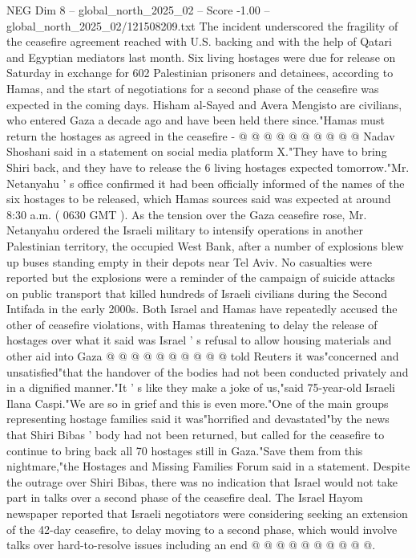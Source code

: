 \begin{textsample}{NEG Dim 8 – global\_north\_2025\_02 – Score -1.00 – global\_north\_2025\_02/121508209.txt}
The incident underscored the fragility of the ceasefire agreement reached with U.S. backing and with the help of Qatari and Egyptian mediators last month.
Six living hostages were due for release on Saturday in exchange for 602 Palestinian prisoners and detainees, according to Hamas, and the start of negotiations for a second phase of the ceasefire was expected in the coming days.
Hisham al-Sayed and Avera Mengisto are civilians, who entered Gaza a decade ago and have been held there since."Hamas must return the hostages as agreed in the ceasefire - @ @ @ @ @ @ @ @ @ @ Nadav Shoshani said in a statement on social media platform X."They have to bring Shiri back, and they have to release the 6 living hostages expected tomorrow."Mr.
Netanyahu ' s office confirmed it had been officially informed of the names of the six hostages to be released, which Hamas sources said was expected at around 8:30 a.m. ( 0630 GMT ).
As the tension over the Gaza ceasefire rose, Mr.
Netanyahu ordered the Israeli military to intensify operations in another Palestinian territory, the occupied West Bank, after a number of explosions blew up buses standing empty in their depots near Tel Aviv.
No casualties were reported but the explosions were a reminder of the campaign of suicide attacks on public transport that killed hundreds of Israeli civilians during the Second Intifada in the early 2000s.
Both Israel and Hamas have repeatedly accused the other of ceasefire violations, with Hamas threatening to delay the release of hostages over what it said was Israel ' s refusal to allow housing materials and other aid into Gaza @ @ @ @ @ @ @ @ @ @ told Reuters it was"concerned and unsatisfied"that the handover of the bodies had not been conducted privately and in a dignified manner."It ' s like they make a joke of us,"said 75-year-old Israeli Ilana Caspi."We are so in grief and this is even more."One of the main groups representing hostage families said it was"horrified and devastated"by the news that Shiri Bibas ' body had not been returned, but called for the ceasefire to continue to bring back all 70 hostages still in Gaza."Save them from this nightmare,"the Hostages and Missing Families Forum said in a statement.
Despite the outrage over Shiri Bibas, there was no indication that Israel would not take part in talks over a second phase of the ceasefire deal.
The Israel Hayom newspaper reported that Israeli negotiators were considering seeking an extension of the 42-day ceasefire, to delay moving to a second phase, which would involve talks over hard-to-resolve issues including an end @ @ @ @ @ @ @ @ @ @.

\end{textsample}
